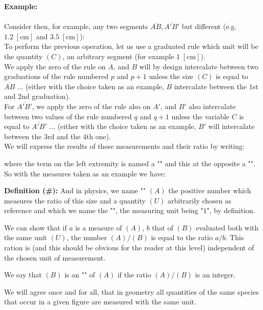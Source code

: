 	\begin{tcolorbox}[colframe=black,colback=white,sharp corners]
	\textbf{{\Large {}}Example:}\\\\
	Consider then, for example, any two segments $\overline{AB}, \overline{A'B'}$ but different (e.g. $1.2\;[\text{cm}]$ and $3.5\;[\text{cm}]$):\\
	
	To perform the previous operation, let us use a graduated rule which unit will be the quantity $(C)$, an arbitrary segment (for example $1 \;[\text{cm}]$).\\
	
	We apply the zero of the rule on $A$, and $B$ will by design intercalate between two graduations of the rule numbered $p$ and $p + 1$ unless the size $(C)$ is equal to $\overline{AB}$ ... (either with the choice taken as an example, $B$ intercalate between the $1$st and $2$nd graduation).\\
	
	For $\overline{A'B'}$, we apply the zero of the rule also on $A'$, and $B'$ also intercalate between two values of the rule numbered $q$ and $q + 1$ unless the variable $C$ is equal to $\overline{A'B'}$ ... (either with the choice taken as an example, $B'$ will intercalate between the $3$rd and the $4$th one).\\
	
	We will express the results of these measurements and their ratio by writing:
	
	where the term on the left extremity is named a "" and this at the opposite a "".\\
	
	So with the measures taken as an example we have:
	
	\end{tcolorbox}
	\textbf{Definition (\#\mydef):} And in physics, we name "" $(A)$ the positive number which measures the ratio of this size and a quantity $(U)$ arbitrarily chosen as reference and which we name the "", the measuring unit being "$1$", by definition.
	
	We can show that if $a$ is a measure of $(A)$, $b$ that of $(B)$ evaluated both with the same unit $(U)$, the number $(A) / (B)$ is equal to the ratio $a / b$. This ration is (and this should be obvious for the reader at this level) independent of the chosen unit of measurement.
	\begin{tcolorbox}[title=Remark,colframe=black,arc=10pt]
	We say that $(B)$ is an "" of $(A)$ if the ratio $(A)/(B)$ is an integer.
	\end{tcolorbox}
	We will agree once and for all, that in geometry all quantities of the same species that occur in a given figure are measured with the same unit.
	
